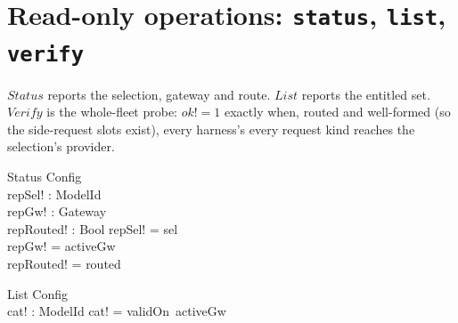 \documentclass{article}
\begin{document}
\section{Read-only operations: \texttt{status}, \texttt{list}, \texttt{verify}}

$Status$ reports the selection, gateway and route. $List$ reports the entitled
set. $Verify$ is the whole-fleet probe: $ok! = 1$ exactly when, routed and
well-formed (so the side-request slots exist), every harness's every request
kind reaches the selection's provider.

\begin{schema}{Status}
  \Xi Config \\
  repSel! : ModelId \\
  repGw! : Gateway \\
  repRouted! : Bool
\where
  repSel! = sel \\
  repGw! = activeGw \\
  repRouted! = routed
\end{schema}

\begin{schema}{List}
  \Xi Config \\
  cat! : \power ModelId
\where
  cat! = validOn~activeGw
\end{schema}


\end{document}

